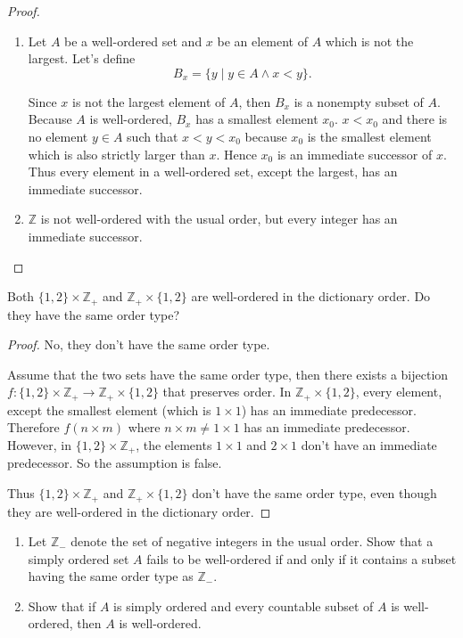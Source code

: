 \begin{proof}
    \begin{enumerate}[label={(\alph*)}]
        \item Let $A$ be a well-ordered set and $x$ be an element of $A$ which is not the largest. Let's define
              \[
                  B_{x} = \{ y \mid y\in A \land x < y \}.
              \]

              Since $x$ is not the largest element of $A$, then $B_{x}$ is a nonempty subset of $A$. Because $A$ is well-ordered, $B_{x}$ has a smallest element $x_{0}$. $x < x_{0}$ and there is no element $y\in A$ such that $x < y < x_{0}$ because $x_{0}$ is the smallest element which is also strictly larger than $x$. Hence $x_{0}$ is an immediate successor of $x$. Thus every element in a well-ordered set, except the largest, has an immediate successor.
        \item $\mathbb{Z}$ is not well-ordered with the usual order, but every integer has an immediate successor.
    \end{enumerate}
\end{proof}

\begin{exercise}\label{chapter1:section10:exercise3}
    Both $\{ 1,2 \}\times\mathbb{Z}_{+}$ and $\mathbb{Z}_{+}\times\{1,2\}$ are well-ordered in the dictionary order. Do they have the same order type?
\end{exercise}

\begin{proof}
    No, they don't have the same order type.

    Assume that the two sets have the same order type, then there exists a bijection $f: \{ 1,2 \}\times\mathbb{Z}_{+}\to \mathbb{Z}_{+}\times\{1,2\}$ that preserves order. In $\mathbb{Z}_{+}\times\{1,2\}$, every element, except the smallest element (which is $1\times 1$) has an immediate predecessor. Therefore $f(n\times m)$ where $n\times m\ne 1\times 1$ has an immediate predecessor. However, in $\{ 1,2 \}\times\mathbb{Z}_{+}$, the elements $1\times 1$ and $2\times 1$ don't have an immediate predecessor. So the assumption is false.

    Thus $\{ 1,2 \}\times\mathbb{Z}_{+}$ and $\mathbb{Z}_{+}\times\{1,2\}$ don't have the same order type, even though they are well-ordered in the dictionary order.
\end{proof}

\begin{exercise}\label{chapter1:section10:exercise4}
    \begin{enumerate}[label={(\alph*)}]
        \item Let $\mathbb{Z}_{-}$ denote the set of negative integers in the usual order. Show that a simply ordered set $A$ fails to be well-ordered if and only if it contains a subset having the same order type as $\mathbb{Z}_{-}$.
        \item Show that if $A$ is simply ordered and every countable subset of $A$ is well-ordered, then $A$ is well-ordered.
    \end{enumerate}
\end{exercise}

